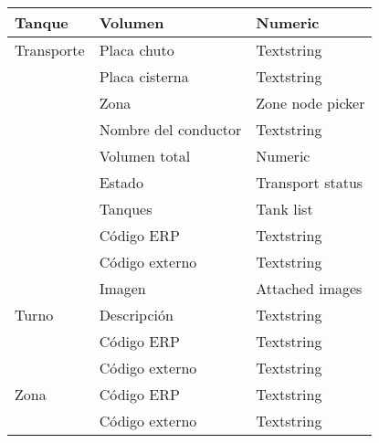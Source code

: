 \begin{longtable}{ | p{5em} | l | l | }
    Tanque
        & Volumen & Numeric \\
    \hline

    Transporte
        & Placa chuto & Textstring \\
        \cline{2-3}
        & Placa cisterna & Textstring \\
        \cline{2-3}
        & Zona & Zone node picker \\
        \cline{2-3}
        & Nombre del conductor & Textstring \\
        \cline{2-3}
        & Volumen total & Numeric \\
        \cline{2-3}
        & Estado & Transport status \\
        \cline{2-3}
        & Tanques & Tank list \\
        \cline{2-3}
        & Código ERP & Textstring \\
        \cline{2-3}
        & Código externo & Textstring \\
        \cline{2-3}
        & Imagen & Attached images \\
    \hline

    Turno
        & Descripción & Textstring \\
        \cline{2-3}
        & Código ERP & Textstring \\
        \cline{2-3}
        & Código externo & Textstring \\
    \hline

    Zona
        & Código ERP & Textstring \\
        \cline{2-3}
        & Código externo & Textstring \\
    \hline
\end{longtable}

